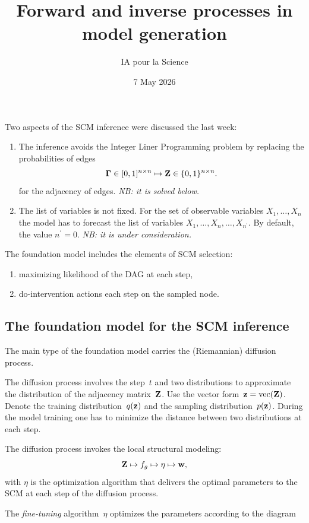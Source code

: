 \documentclass[12pt]{article}
\title{Forward and inverse processes in model generation}
\author{IA pour la Science}
\date{7 May 2026}
\begin{document}
\maketitle

Two aspects of the SCM inference were discussed the last week:
\begin{enumerate}
\item The inference avoids the  Integer Liner Programming problem by replacing the probabilities of edges
\[{\boldsymbol{\Gamma}} \in [0,1]^{n\times n} \mapsto \mathbf{Z} \in \{0,1\}^{n\times n}.\]
for the adjacency of edges. \emph{NB: it is solved below.}
\item  The list of variables is not fixed.
For the set of observable variables $X_1,\dots,X_n$
the model has to forecast the list of variables $X_1,\dots,X_n, \dots, X_{n^\prime}$.
By default, the value $n^\prime=0$. \emph{NB: it is under consideration.}
\end{enumerate}

The foundation model includes the elements of SCM selection:
\begin{enumerate}[1)]
\item maximizing likelihood of the DAG at each step,
\item do-intervention actions each step on the sampled node.
\end{enumerate}

\subsection*{The foundation model for the SCM inference}
The main type of the foundation model carries the (Riemannian) diffusion process.

The diffusion process involves the step~$t$ and two distributions to approximate the distribution of 
the adjacency matrix~$\mathbf{Z}$.
Use the vector form~$\mathbf{z} = \text{vec}(\mathbf{Z})$.
Denote the training distribution~$q(\mathbf{z})$ and the sampling distribution~$p(\mathbf{z})$.
During the model training one has to minimize the distance between two distributions at each step. 

The diffusion process invokes the local structural modeling:
\[
\mathbf{Z} \mapsto f_g \mapsto \eta \mapsto \mathbf{w},
\]
with $\eta$ is the optimization algorithm that delivers the optimal parameters to the SCM at each step of the diffusion process.

The \emph{fine-tuning} algorithm~$\eta$ optimizes the parameters according to the diagram
\end{document}
